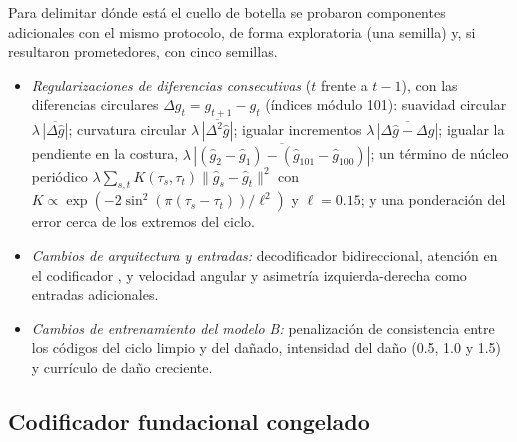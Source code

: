 \documentclass[11pt,a4paper]{amsart}
\begin{document}
Para delimitar dónde está el cuello de botella se probaron componentes adicionales con el mismo protocolo, de forma exploratoria (una semilla) y, si resultaron prometedores, con cinco semillas.
\begin{itemize}
\item \textit{Regularizaciones de diferencias consecutivas} ($t$ frente a $t-1$), con las diferencias circulares $\Delta g_t=g_{t+1}-g_t$ (índices módulo 101): suavidad circular $\lambda\,\overline{|\Delta\hat g|}$; curvatura circular $\lambda\,\overline{|\Delta^2\hat g|}$; igualar incrementos $\lambda\,\overline{|\Delta\hat g-\Delta g|}$; igualar la pendiente en la costura, $\lambda\,\overline{|(\hat g_2-\hat g_1)-(\hat g_{101}-\hat g_{100})|}$; un término de núcleo periódico $\lambda\sum_{s,t}K(\tau_s,\tau_t)\|\hat g_s-\hat g_t\|^2$ con $K\propto\exp(-2\sin^2(\pi(\tau_s-\tau_t))/\ell^2)$ y $\ell=0.15$; y una ponderación del error cerca de los extremos del ciclo.
\item \textit{Cambios de arquitectura y entradas:} decodificador bidireccional, atención en el codificador \cite{bahdanau2015}, y velocidad angular y asimetría izquierda-derecha como entradas adicionales.
\item \textit{Cambios de entrenamiento del modelo B:} penalización de consistencia entre los códigos del ciclo limpio y del dañado, intensidad del daño (0.5, 1.0 y 1.5) y currículo de daño creciente.
\end{itemize}

\subsection{Codificador fundacional congelado}
\label{sec:fundacional_met}
\end{document}
